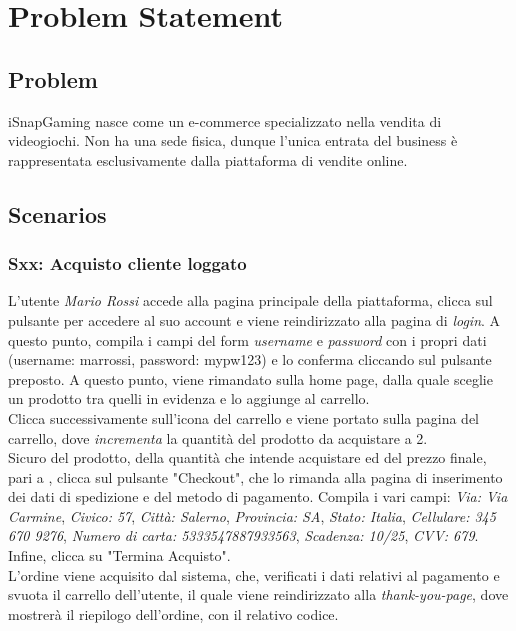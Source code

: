 \documentclass[12pt, a4paper, oneside]{book}
\begin{document}
    \setcounter{tocdepth}{3} %

    \tableofcontents

    \chapter*{Problem Statement}
    \section*{Problem}
    iSnapGaming nasce come un e-commerce specializzato nella vendita di videogiochi. Non ha una sede fisica, dunque l'unica entrata del business è rappresentata esclusivamente dalla piattaforma di vendite online.

    \section*{Scenarios}
    \subsection*{Sxx: Acquisto cliente loggato}
    L'utente \textit{Mario Rossi} accede alla pagina principale della piattaforma, clicca sul pulsante per accedere al suo account e viene reindirizzato alla pagina di \textit{login}. A questo punto, compila i campi del form \textit{username} e \textit{password} con i propri dati (username: marrossi, password: mypw123) e lo conferma cliccando sul pulsante preposto. A questo punto, viene rimandato sulla home page, dalla quale sceglie un prodotto tra quelli in evidenza e lo aggiunge al carrello.\\
    Clicca successivamente sull'icona del carrello e viene portato sulla pagina del carrello, dove \textit{incrementa} la quantità del prodotto da acquistare a 2.\\
    Sicuro del prodotto, della quantità che intende acquistare ed del prezzo finale, pari a , clicca sul pulsante "Checkout", che lo rimanda alla pagina di inserimento dei dati di spedizione e del metodo di pagamento. Compila i vari campi: \textit{Via: Via Carmine}, \textit{Civico: 57}, \textit{Città: Salerno}, \textit{Provincia: SA}, \textit{Stato: Italia}, \textit{Cellulare: 345 670 9276}, \textit{Numero di carta: 5333547887933563}, \textit{Scadenza: 10/25}, \textit{CVV: 679}. Infine, clicca su "Termina Acquisto".\\
    L'ordine viene acquisito dal sistema, che, verificati i dati relativi al pagamento e svuota il carrello dell'utente, il quale viene reindirizzato alla \textit{thank-you-page}, dove mostrerà il riepilogo dell'ordine, con il relativo codice.
\end{document}
